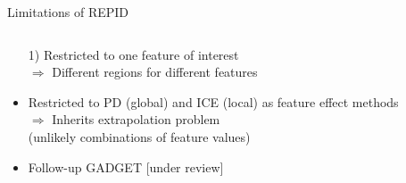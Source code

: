 \documentclass[11pt,compress,t,notes=noshow, aspectratio=169, xcolor=table,dvipsnames]{beamer}
\begin{document}
\begin{frame}{Limitations of REPID}

\begin{columns}[T, totalwidth = \textwidth]
    \begin{column}{0.48\textwidth}

      \begin{itemize}
  \item[1)] Restricted to one feature of interest \\
  $\Rightarrow$ Different regions for different features \\
  \item<2->[2)] Restricted to PD (global) and ICE (local) as feature effect methods\\
  $\Rightarrow$ Inherits extrapolation problem\\
  (unlikely combinations of feature values)
   \item<2->[$\leadsto$] Follow-up GADGET %
[under review]
  \end{itemize}


    \end{column}


\end{columns}
\end{frame}
\end{document}
